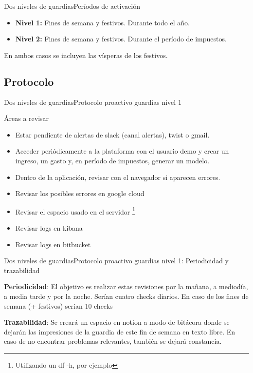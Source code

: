 \documentclass[12pt, aspectratio=169]{beamer} %
\begin{document}
\begin{frame}{Dos niveles de guardias}{Períodos de activación}
  \begin{itemize}
  \item \textbf{Nivel 1:} Fines de semana y festivos. Durante todo el año.
  \item \textbf{Nivel 2:} Fines de semana y festivos. Durante el período de impuestos.
  \end{itemize}

  En ambos casos se incluyen las vísperas de los festivos.

\end{frame}

\subsection{Protocolo}

\begin{frame}{Dos niveles de guardias}{Protocolo proactivo guardias nivel 1}
  \begin{block}{Áreas a revisar}
    \begin{itemize}
    \item Estar pendiente de alertas de slack (canal alertas), twist o gmail.
    \item Acceder periódicamente a la plataforma con el usuario demo y crear un ingreso, un gasto y, en período de impuestos, generar un modelo.
    \item Dentro de la aplicación, revisar con el navegador si aparecen errores.
    \item Revisar los posibles errores en google cloud
    \item Revisar el espacio usado en el servidor \footnote{Utilizando un df -h, por ejemplo}
    \item Revisar logs en kibana
    \item Revisar logs en bitbucket
    \end{itemize}
 \end{block}

\end{frame}

\begin{frame}{Dos niveles de guardias}{Protocolo proactivo guardias nivel 1: Periodicidad y trazabilidad}


 \textbf{Periodicidad}: El objetivo es realizar estas revisiones por la mañana, a mediodía, a media tarde y por la noche. Serían cuatro checks diarios. En caso de los fines de semana (+ festivos) serían 10 checks

 \textbf{Trazabilidad}: Se creará un espacio en notion a modo de bitácora donde se dejarán las impresiones de la guardia de este fin de semana en texto libre. En caso de no encontrar problemas relevantes, también se dejará constancia.
  
\end{frame}
\end{document}
